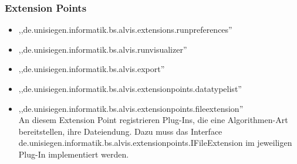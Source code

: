 \documentclass[10pt,a4paper,oneside]{scrbook}
\begin{document}
\subsubsection{Extension Points}
\begin{itemize}
 \item ,,de.unisiegen.informatik.bs.alvis.extensions.runpreferences''\\
 \item ,,de.unisiegen.informatik.bs.alvis.runvisualizer''\\
 \item ,,de.unisiegen.informatik.bs.alvis.export''\\
 \item ,,de.unisiegen.informatik.bs.alvis.extensionpoints.datatypelist''\\
 \item ,,de.unisiegen.informatik.bs.alvis.extensionpoints.fileextension''\\ An diesem Extension Point registrieren Plug-Ins,
	  die eine Algorithmen-Art bereitstellen, ihre Dateiendung. Dazu muss das Interface\\
	  de.unisiegen.informatik.bs.alvis.extensionpoints.IFileExtension im jeweiligen Plug-In implementiert werden.
\end{itemize}
\end{document}
